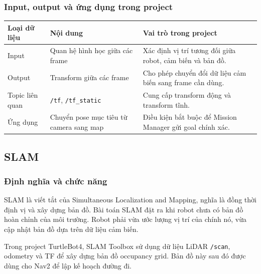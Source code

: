 \subsubsection{Input, output và ứng dụng trong project}

\renewcommand{\arraystretch}{1.25}
\begin{longtable}{|
  >{\raggedright\arraybackslash}p{}|
  >{\raggedright\arraybackslash}p{}|
  >{\raggedright\arraybackslash}p{}|}
\hline
\textbf{Loại dữ liệu} & \textbf{Nội dung} & \textbf{Vai trò trong project} \\ \hline
\hline
\endhead
\hline
\endlastfoot
Input & Quan hệ hình học giữa các frame & Xác định vị trí tương đối giữa
robot, cảm biến và bản đồ. \\ \hline
Output & Transform giữa các frame & Cho phép chuyển đổi dữ liệu cảm biến
sang frame cần dùng. \\ \hline
Topic liên quan & \texttt{/tf}, \texttt{/tf\_static} & Cung cấp
transform động và transform tĩnh. \\ \hline
Ứng dụng & Chuyển pose mục tiêu từ camera sang map & Điều kiện bắt buộc
để Mission Manager gửi goal chính xác. \\ \hline
\end{longtable}

\subsection{SLAM}\label{subsec:slam}

\subsubsection{Định nghĩa và chức năng}

SLAM là viết tắt của Simultaneous Localization and Mapping, nghĩa là
đồng thời định vị và xây dựng bản đồ. Bài toán SLAM đặt ra khi robot
chưa có bản đồ hoàn chỉnh của môi trường. Robot phải vừa ước lượng vị
trí của chính nó, vừa cập nhật bản đồ dựa trên dữ liệu cảm biến.

Trong project TurtleBot4, SLAM Toolbox sử dụng dữ liệu LiDAR
\texttt{/scan}, odometry và TF để xây dựng bản đồ occupancy grid. Bản đồ
này sau đó được dùng cho Nav2 để lập kế hoạch đường đi.

